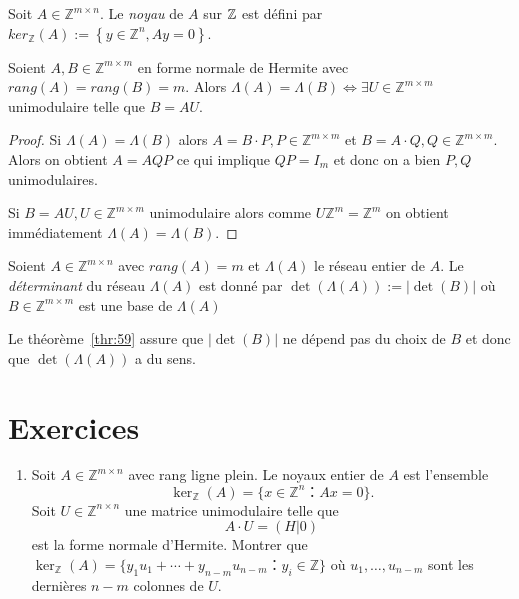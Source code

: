   \begin{definition}
    \label{def:62}
    Soit $A \in \mathbb{Z}^{m \times n}$. Le \emph{noyau} de $A$ sur $\mathbb{Z}$ est défini par $ker_{\mathbb{Z}}(A) := \left\{ y \in \mathbb{Z}^n, Ay=0 \right\}  $.
  \end{definition}
  
  \begin{theorem}
    \label{thr:59}
    Soient $A,B \in \mathbb{Z}^{m \times m}$ en forme normale de Hermite avec $rang(A)=rang(B)=m$. Alors $\Lambda(A)=\Lambda(B) \Leftrightarrow \exists U\in \mathbb{Z}^{m \times m}$ unimodulaire telle que $B=AU$.
  \end{theorem}
  
  \begin{proof}
 Si $\Lambda(A)=\Lambda(B)$ alors $A=B⋅ P, P\in \mathbb{Z}^{m \times m}$ et  $B=A⋅Q, Q\in \mathbb{Z}^{m \times m}$. Alors on obtient $A=AQP$ ce qui implique $QP=I_m$ et donc on a bien $P,Q$ unimodulaires.

 Si $B=AU, U\in \mathbb{Z}^{m \times m}$ unimodulaire alors comme $U \mathbb{Z}^{m}= \mathbb{Z}^{m}$ on obtient immédiatement  $\Lambda(A)=\Lambda(B)$.
\end{proof}
\begin{definition}
  \label{def:48}
  Soient $A\in \mathbb{Z}^{m \times n}$ avec $rang(A)=m$ et
  $\Lambda(A)$ le réseau entier de $A$. Le \emph{déterminant} du
  réseau $\Lambda(A)$ est donné par $\det(\Lambda(A)):=|\det(B)|$ où
  $B \in \mathbb{Z}^{m \times m}$ est une base de $\Lambda(A)$
   \end{definition}
   
   \begin{remark}
    Le théorème~\ref{thr:59} assure que $|\det(B)|$ ne dépend pas du choix de $B$ et donc que $\det(\Lambda(A))$ a du sens.
    \end{remark}
  
\section*{Exercices}
\begin{enumerate}
\item Soit $A ∈ℤ^{m ×n}$ avec rang ligne plein. Le noyaux entier de $A$ est l'ensemble
  \begin{displaymath}
    \ker_ℤ(A) = \{x ∈ℤ^n ： Ax = 0\}. 
  \end{displaymath}
  Soit  $U ∈ℤ^{n ×n}$ une matrice unimodulaire telle que
  \begin{displaymath}
    A ⋅ U = (H | 0) 
  \end{displaymath}
  est la forme normale d'Hermite.
  Montrer que $\ker_ℤ(A) = \{ y_1 u_1 + \cdots + y_{n-m} u_{n-m} ： y_i ∈ℤ\}$ où $u_1,\dots,u_{n-m}$ sont les dernières $n-m$ colonnes de $U$. 
\end{enumerate}

